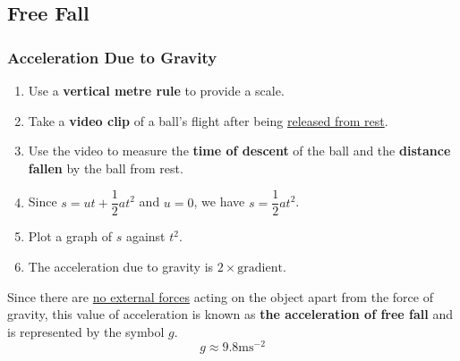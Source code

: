 \subsection{Free Fall}

\subsubsection*{Acceleration Due to Gravity}

\begin{enumerate}
    \item Use a \textbf{vertical metre rule} to provide a scale.
    \item Take a \textbf{video clip} of a ball's flight after being \underline{released from rest}.
    \item Use the video to measure the \textbf{time of descent} of the ball and the \textbf{distance fallen} by the ball from rest.
    \item Since $s=ut+\dfrac{1}{2}at^2$ and $u=0$, we have $s=\dfrac{1}{2}at^2$.
    \item Plot a graph of $s$ against $t^2$.
    \item The acceleration due to gravity is $2\times\text{gradient}$.
\end{enumerate}

Since there are \underline{no external forces} acting on the object apart from the force of gravity, this value of acceleration is known as \textbf{the acceleration of free fall} and is represented by the symbol $g$.
$$g\approx9.8\text{ms}^{-2}$$
